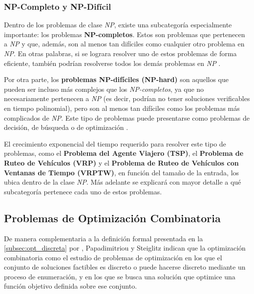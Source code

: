\documentclass[12pt,titlepage,twoside,openright]{book}
\begin{document}
\subsubsection{NP-Completo y NP-Difícil}

Dentro de los problemas de clase \emph{NP}, existe una subcategoría especialmente importante: los problemas \textbf{NP-completos}. Estos son problemas que pertenecen a \emph{NP} y que, además, son al menos tan difíciles como cualquier otro problema en \emph{NP}. En otras palabras, si se lograra resolver uno de estos problemas de forma eficiente, también podrían resolverse todos los demás problemas en \emph{NP} \citep{maldonado2013problema}.

Por otra parte, los \textbf{problemas NP-difíciles (NP-hard)} son aquellos que pueden ser incluso más complejos que los \emph{NP-completos}, ya que no necesariamente pertenecen a \emph{NP} (es decir, podrían no tener soluciones verificables en tiempo polinomial), pero son al menos tan difíciles como los problemas más complicados de \emph{NP}. Este tipo de problemas puede presentarse como problemas de decisión, de búsqueda o de optimización \citep{maldonado2013problema}.

El crecimiento exponencial del tiempo requerido para resolver este tipo de problemas, como el \textbf{Problema del Agente Viajero (TSP)}, el \textbf{Problema de Ruteo de Vehículos (VRP)} y el \textbf{Problema de Ruteo de Vehículos con Ventanas de Tiempo (VRPTW)}, en función del tamaño de la entrada, los ubica dentro de la clase \emph{NP}. Más adelante se explicará con mayor detalle a qué subcategoría pertenece cada uno de estos problemas.

\subsection{Problemas de Optimización Combinatoria}

De manera complementaria a la definición formal presentada en la \autoref{subsec:opt_discreta} por \citep{cobos2010}, Papadimitriou y Steiglitz \citep{papadimitriou1998} indican que la optimización combinatoria como el estudio de problemas de optimización en los que el conjunto de soluciones factibles es discreto o puede hacerse discreto mediante un proceso de enumeración, y en los que se busca una solución que optimice una función objetivo definida sobre ese conjunto.
\end{document}
